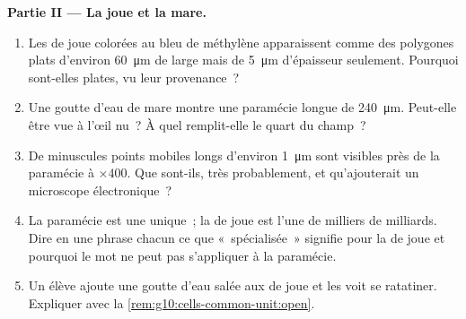 \begin{problem}
\medskip
\noindent\textbf{Partie II --- La joue et la mare.}
\begin{enumerate}[resume]
  \item Les  de joue colorées au bleu de méthylène
        apparaissent comme des polygones plats d'environ
        \qty{60}{\micro m} de large mais de \qty{5}{\micro m}
        d'épaisseur seulement. Pourquoi sont-elles plates, vu leur
        provenance~?
  \item Une goutte d'eau de mare montre une paramécie longue de
        \qty{240}{\micro m}. Peut-elle être vue à l'œil nu~? À quel
         remplit-elle le quart du champ~?
  \item De minuscules points mobiles longs d'environ \qty{1}{\micro m}
        sont visibles près de la paramécie à $\times 400$. Que
        sont-ils, très probablement, et qu'ajouterait un microscope
        électronique~?
  \item La paramécie est une  unique~; la  de joue est
        l'une de milliers de milliards. Dire en une phrase chacun ce
        que «~spécialisée~» signifie pour la  de joue et
        pourquoi le mot ne peut pas s'appliquer à la paramécie.
  \item Un élève ajoute une goutte d'eau salée aux  de joue et
        les voit se ratatiner. Expliquer avec la
        \cref{rem:g10:cells-common-unit:open}.
\end{enumerate}


\end{problem}

